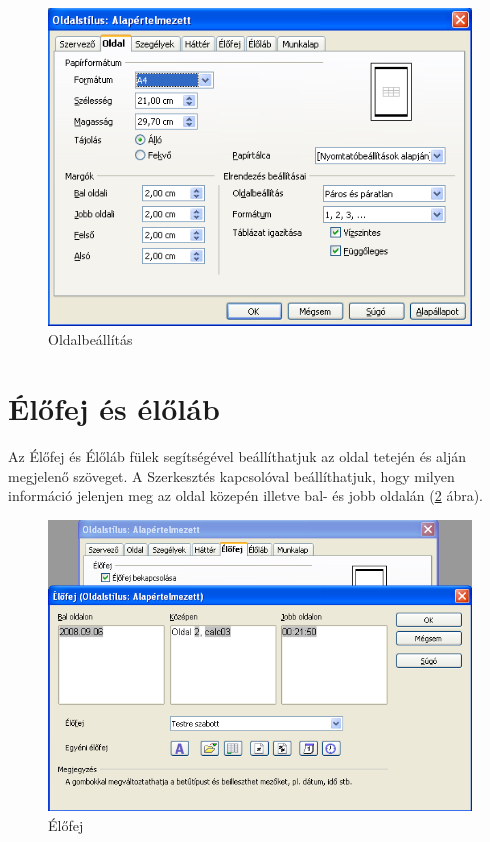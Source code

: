 \begin{figure}[!h]
\begin{center}
\includegraphics[width=12.944cm]{oocalcv1-img165.png}
\caption{Oldalbeállítás}\label{Oldalbeállítás}
\end{center}
\end{figure}


\section{Élőfej és élőláb}

Az Élőfej és Élőláb fülek segítségével
beállíthatjuk az oldal tetején és alján megjelenő
szöveget. A Szerkesztés kapcsolóval beállíthatjuk, hogy
milyen információ jelenjen meg az oldal közepén illetve bal-
és jobb oldalán (\ref{Élőfej} ábra).

\begin{figure}[!h]
\begin{center}
\includegraphics[width=14.999cm]{oocalcv1-img166.png}
\caption{Élőfej}\label{Élőfej}
\end{center}
\end{figure}

